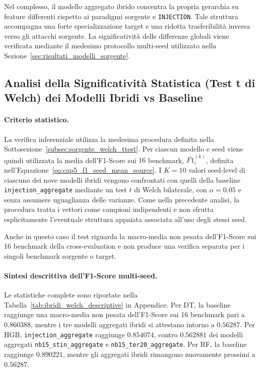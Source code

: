 Nel complesso, il modello aggregato ibrido concentra la propria gerarchia su feature differenti rispetto ai paradigmi sorgente e \texttt{INJECTION}.
Tale struttura accompagna una forte specializzazione target e una ridotta trasferibilità inversa verso gli attacchi sorgente. 
La significatività delle differenze globali viene verificata mediante il medesimo protocollo multi-seed utilizzato nella Sezione~\ref{sec:risultati_modelli_sorgente}.



\subsection{Analisi della Significatività Statistica (Test t di Welch) dei Modelli Ibridi vs Baseline}
\label{subsec:ibridi_welch_ttest}

\paragraph{Criterio statistico.}
La verifica inferenziale utilizza la medesima procedura definita nella Sottosezione~\ref{subsec:sorgente_welch_ttest}. 
Per ciascun modello e seed viene quindi utilizzata la media dell'F1-Score sui $16$ benchmark, $\overline{F1}_{i}^{(k)}$, definita nell'Equazione~\eqref{eq:cap5_f1_seed_mean_source}. 
I $K=10$ valori seed-level di ciascuno dei nove modelli ibridi vengono confrontati con quelli della baseline \texttt{injection\_aggregate} mediante un test $t$ di Welch bilaterale, con $\alpha=0.05$ e senza assumere uguaglianza delle varianze. Come nella precedente analisi, la procedura tratta i vettori come campioni indipendenti e non sfrutta esplicitamente l'eventuale struttura appaiata associata all'uso degli stessi seed.

Anche in questo caso il test riguarda la macro-media non pesata dell'F1-Score sui 16 benchmark della cross-evaluation e non produce una verifica separata per i singoli benchmark sorgente o target.

\paragraph{Sintesi descrittiva dell'F1-Score multi-seed.}
Le statistiche complete sono riportate nella Tabella~\ref{tab:ibridi_welch_descriptive} in Appendice. 
Per DT, la baseline raggiunge una macro-media non pesata dell'F1-Score sui 16 benchmark pari a $0.860388$, mentre i tre modelli aggregati ibridi si attestano intorno a $0.56287$. 
Per HGB, \texttt{injection\_aggregate} raggiunge $0.854074$, contro $0.562881$ dei modelli aggregati \texttt{nb15\_stin\_aggregate} e \newline \texttt{nb15\_ter20\_aggregate}. 
Per RF, la baseline raggiunge $0.890221$, mentre gli aggregati ibridi rimangono nuovamente prossimi a $0.56287$.

